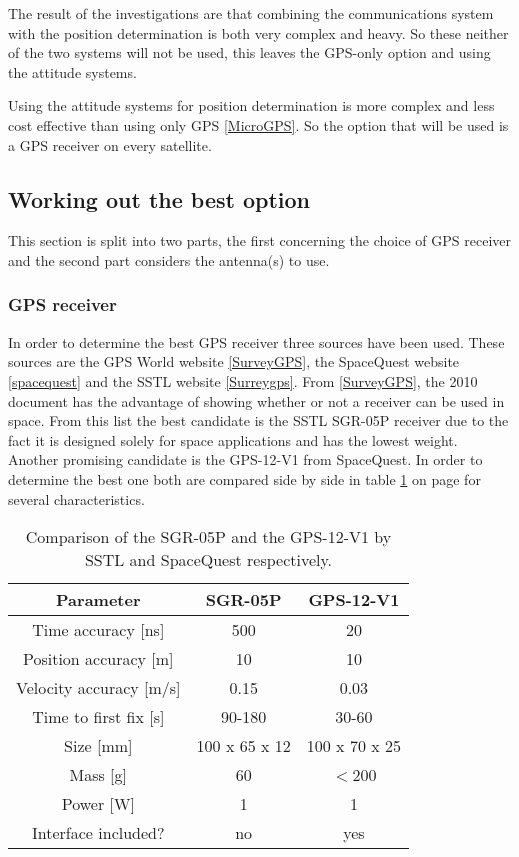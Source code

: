 The result of the investigations are that combining the communications system with the position determination is both very complex and heavy. So these neither of the two systems will not be used, this leaves the \acs{GPS}-only option and using the attitude systems.

Using the attitude systems for position determination is more complex and less cost effective than using only \acs{GPS} \ref{MicroGPS}. So the option that will be used is a \acs{GPS} receiver on every satellite.

\subsection{Working out the best option}
\label{navi3}
This section is split into two parts, the first concerning the choice of \acs{GPS} receiver and the second part considers the antenna(s) to use.

\subsubsection{GPS receiver}
In order to determine the best \acs{GPS} receiver three sources have been used. These sources are the GPS World website \ref{SurveyGPS}, the SpaceQuest website \ref{spacequest} and the \ac{SSTL} website \ref{Surreygps}. From \ref{SurveyGPS}, the 2010 document has the advantage of showing whether or not a receiver can be used in space. From this list the best candidate is the \acs{SSTL} SGR-05P receiver due to the fact it is designed solely for space applications and has the lowest weight. Another promising candidate is the GPS-12-V1 from SpaceQuest. In order to determine the best one both are compared side by side in table \ref{comparegps} on page \pageref{comparegps} for several characteristics.

\begin{table}
\centering
\begin{tabular}{c||c|c}
\textbf{Parameter} & \textbf{SGR-05P} & \textbf{GPS-12-V1} \\\hline\hline
	Time accuracy [ns] & 500 & 20 \\
	Position accuracy [m] & 10 & 10 \\
	Velocity accuracy [m/s] & 0.15 & 0.03 \\
	Time to first fix [s] & 90-180 & 30-60 \\
	Size [mm] & 100 x 65 x 12 & 100 x 70 x 25\\
	Mass [g] & 60 & $<$200 \\
	Power [W] & 1 & 1 \\
	Interface included? & no & yes \\
\end{tabular}
\caption{Comparison of the SGR-05P and the GPS-12-V1 by \acs{SSTL} and SpaceQuest respectively.}
\label{comparegps}
\end{table}

